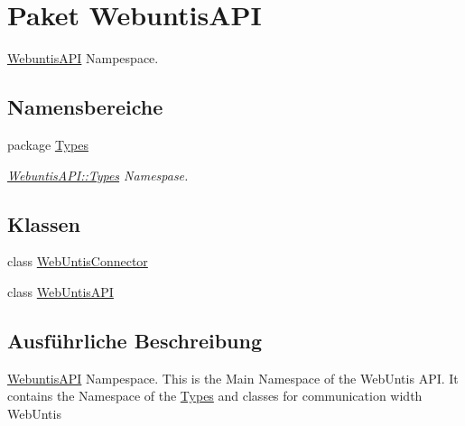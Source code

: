 \hypertarget{namespace_webuntis_a_p_i}{\section{Paket Webuntis\-A\-P\-I}
\label{namespace_webuntis_a_p_i}
}


\hyperlink{namespace_webuntis_a_p_i}{Webuntis\-A\-P\-I} Nampespace.  


\subsection*{Namensbereiche}
\begin{DoxyCompactItemize}
\item 
package \hyperlink{namespace_webuntis_a_p_i_1_1_types}{Types}
\begin{DoxyCompactList}\small\item\em \hyperlink{namespace_webuntis_a_p_i_1_1_types}{Webuntis\-A\-P\-I\-::\-Types} Namespase. \end{DoxyCompactList}\end{DoxyCompactItemize}
\subsection*{Klassen}
\begin{DoxyCompactItemize}
\item 
class \hyperlink{class_webuntis_a_p_i_1_1_web_untis_connector}{Web\-Untis\-Connector}
\item 
class \hyperlink{class_webuntis_a_p_i_1_1_web_untis_a_p_i}{Web\-Untis\-A\-P\-I}
\end{DoxyCompactItemize}


\subsection{Ausführliche Beschreibung}
\hyperlink{namespace_webuntis_a_p_i}{Webuntis\-A\-P\-I} Nampespace. This is the Main Namespace of the Web\-Untis A\-P\-I. It contains the Namespace of the \hyperlink{namespace_webuntis_a_p_i_1_1_types}{Types} and classes for communication width Web\-Untis 